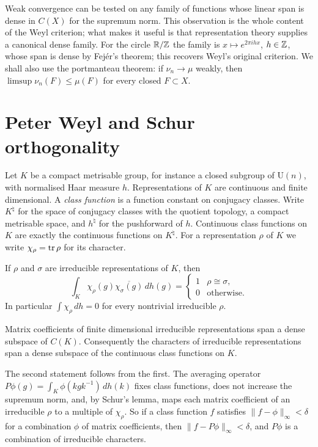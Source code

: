 Weak convergence can be tested on any family of functions whose linear span is dense in $C(X)$ for the supremum norm. This observation is the whole content of the Weyl criterion; what makes it useful is that representation theory supplies a canonical dense family. For the circle $\mathbb{R}/\mathbb{Z}$ the family is $x \mapsto e^{2\pi ihx}$, $h \in \mathbb{Z}$, whose span is dense by Fej\'er's theorem; this recovers Weyl's original criterion. We shall also use the portmanteau theorem: if $\nu_n \to \mu$ weakly, then $\limsup \nu_n(F) \le \mu(F)$ for every closed $F \subset X$.

\section{Peter Weyl and Schur orthogonality}

Let $K$ be a compact metrisable group, for instance a closed subgroup of $\mathrm{U}(n)$, with normalised Haar measure $h$. Representations of $K$ are continuous and finite dimensional. A \emph{class function} is a function constant on conjugacy classes. Write $K^\natural$ for the space of conjugacy classes with the quotient topology, a compact metrisable space, and $h^\natural$ for the pushforward of $h$. Continuous class functions on $K$ are exactly the continuous functions on $K^\natural$. For a representation $\rho$ of $K$ we write $\chi_\rho = \operatorname{tr} \rho$ for its character.

\begin{theorem}
If $\rho$ and $\sigma$ are irreducible representations of $K$, then
\[
\int_K \chi_\rho(g)\overline{\chi_\sigma(g)}\,dh(g) =
\begin{cases} 1 & \rho \cong \sigma,\\ 0 & \text{otherwise.}\end{cases}
\]
In particular $\int \chi_\rho\,dh = 0$ for every nontrivial irreducible $\rho$.
\end{theorem}

\begin{theorem}
Matrix coefficients of finite dimensional irreducible representations span a dense subspace of $C(K)$. Consequently the characters of irreducible representations span a dense subspace of the continuous class functions on $K$.
\end{theorem}

The second statement follows from the first. The averaging operator $P\phi(g) = \int_K \phi(kgk^{-1})\,dh(k)$ fixes class functions, does not increase the supremum norm, and, by Schur's lemma, maps each matrix coefficient of an irreducible $\rho$ to a multiple of $\chi_\rho$. So if a class function $f$ satisfies $\|f - \phi\|_\infty < \delta$ for a combination $\phi$ of matrix coefficients, then $\|f - P\phi\|_\infty < \delta$, and $P\phi$ is a combination of irreducible characters.

